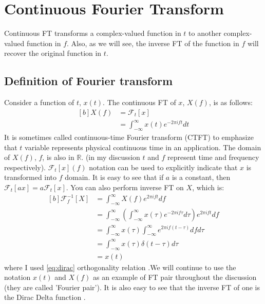 \documentclass[letterpaper, 11pt]{article}
\newcommand{\fint}{\int_{-\infty}^{\infty}} %
\newcommand{\fourier}[2]{\mathcal{F}_{#1}[#2]} %
\newcommand{\ifourier}[2]{\mathcal{F}_{#1}^{-1}[#2]} %
\newcommand{\ft}[3]{\fint #2 e^{-2\pi i#3#1} d#1} %
\newcommand{\ift}[3]{\fint #2 e^{2\pi i#1#3} d#1} %
\numberwithin{equation}{section}
\numberwithin{figure}{section}
\numberwithin{table}{section}
\begin{document}
\clearpage
\section{Continuous Fourier Transform}
Continuous FT transforms a complex-valued function in \(t\) to another complex-valued function in \(f\). Also, as we will see, the inverse FT of the function in \(f\) will recover the original function in \(t\). 

\subsection{Definition of Fourier transform}
Consider a function of \(t\), \(x(t)\). The continuous FT of \(x\), \(X(f)\), is as follows:
\begin{equation}
	\begin{aligned}[b]
		X(f)	&=\fourier{t}{x} \\
			&=\ft{t}{x(t)}{f}
	\end{aligned}
\end{equation}
It is sometimes called continuous-time Fourier transform (CTFT) to emphasize that \(t\) variable represents physical continuous time in an application. The domain of \(X(f)\), \(f\), is also in \(\mathbb{R}\). (in my discussion \(t\) and \(f\) represent time and frequency respectively). \(\fourier{t}{x}(f)\) notation can be used to explicitly indicate that \(x\) is transformed into \(f\) domain. It is easy to see that if \(a\) is a constant, then \(\fourier{t}{ax} = a \fourier{t}{x}\). You can also perform inverse FT on \(X\), which is:
\begin{equation}
	\begin{aligned}[b]
		\ifourier{f}{X}	&= \ift{f}{X(f)}{t} \\
				&= \ift{f}{\left ( \ft{\tau}{x(\tau)}{f}\right )}{t} \\
				&= \fint x(\tau) \fint e^{2\pi if(t - \tau)} df d\tau \\
				&= \fint x(\tau) \delta (t - \tau) d\tau \\
				&= x(t)
	\end{aligned}
\end{equation}
where I used \eqref{eq:dirac} orthogonality relation .We will continue to use the notation \(x(t)\) and \(X(f)\) as an example of FT pair throughout the discussion (they are called 'Fourier pair'). It is also easy to see that the inverse FT of one is the Dirac Delta function \cite{james}.
\end{document}
